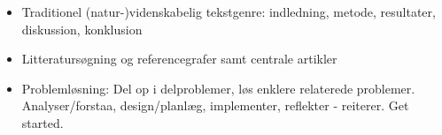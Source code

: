 \documentclass[a4paper,landscape]{slides}
\begin{document}
\begin{slide}
\begin{itemize}
   \item Traditionel (natur-)videnskabelig tekstgenre: indledning, metode, resultater, diskussion, konklusion
   \item Litteratursøgning og referencegrafer samt centrale artikler
   \item Problemløsning: Del op i delproblemer, løs enklere relaterede problemer. Analyser/forstaa, design/planlæg, implementer, reflekter - reiterer. Get started.
\end{itemize} \end{slide}
\end{document}
